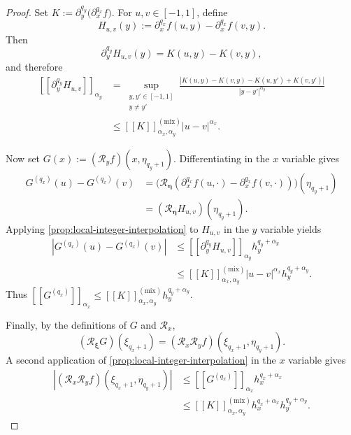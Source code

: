 \documentclass[11pt]{article}
\theoremstyle{definition}
\theoremstyle{remark}
\newcommand{\abs}[1]{\left\lvert #1\right\rvert}
\newcommand{\seminorm}[1]{\left[\!\left[ #1\right]\!\right]}
\begin{document}
\begin{proof}
Set $K:=  \partial_y^{q_y}\bigl(\partial_x^{q_x}f\bigr)$.
For $u,v\in[-1,1]$, define
\[
    H_{u,v}(y)
    :=
    \partial_x^{q_x}f(u,y)
    -
    \partial_x^{q_x}f(v,y).
\]
Then
\[
    \partial_y^{q_y}H_{u,v}(y)
    =
    K(u,y)-K(v,y),
\]
and therefore
\begin{align*}
    \seminorm{\partial_y^{q_y}H_{u,v}}_{\alpha_y}
    &=
    \sup_{\substack{y,y'\in[-1,1]\\y\ne y'}}
    \frac{
      \abs{
        K(u,y)-K(v,y)-K(u,y')+K(v,y')
      }
    }{
      \abs{y-y'}^{\alpha_y}
    }\\
    &\le
    \seminorm{K}_{\alpha_x,\alpha_y}^{(\mathrm{mix})}
    \abs{u-v}^{\alpha_x}.
\end{align*}

Now set
$G(x):=(\mathcal R_yf)(x,\eta_{q_y+1})$.
Differentiating in the $x$ variable
gives
\begin{align*}
    G^{(q_x)}(u)-G^{(q_x)}(v)
    &=
    \bigl(
      \mathcal R_{\boldsymbol\eta}
      (
        \partial_x^{q_x}f(u,\cdot)
        -
        \partial_x^{q_x}f(v,\cdot)
      )
    \bigr)(\eta_{q_y+1})\\
    &=
    (\mathcal R_{\boldsymbol\eta}H_{u,v})(\eta_{q_y+1}).
\end{align*}
Applying \cref{prop:local-integer-interpolation} to $H_{u,v}$ in the
$y$ variable yields
\begin{align*}
    \abs{
      G^{(q_x)}(u)-G^{(q_x)}(v)
    }
    &\le
    \seminorm{\partial_y^{q_y}H_{u,v}}_{\alpha_y}
    h_y^{q_y+\alpha_y}\\
    &\le
    \seminorm{K}_{\alpha_x,\alpha_y}^{(\mathrm{mix})}
    \abs{u-v}^{\alpha_x}h_y^{q_y+\alpha_y}.
\end{align*}
Thus
$
    \seminorm{G^{(q_x)}}_{\alpha_x}
    \le
    \seminorm{K}_{\alpha_x,\alpha_y}^{(\mathrm{mix})}
    h_y^{q_y+\alpha_y}
$.

Finally, by the definitions of $G$ and $\mathcal R_x$,
\[
    (\mathcal R_{\boldsymbol\xi}G)(\xi_{q_x+1})
    =
    (\mathcal R_x\mathcal R_yf)
    (\xi_{q_x+1},\eta_{q_y+1}).
\]
A second application of
\cref{prop:local-integer-interpolation} in the $x$ variable gives
\begin{align*}
    \abs{
      (\mathcal R_x\mathcal R_yf)
      (\xi_{q_x+1},\eta_{q_y+1})
    }
    &\le
    \seminorm{G^{(q_x)}}_{\alpha_x}
    h_x^{q_x+\alpha_x}\\
    &\le
    \seminorm{K}_{\alpha_x,\alpha_y}^{(\mathrm{mix})}
    h_x^{q_x+\alpha_x}h_y^{q_y+\alpha_y}.
\end{align*}
\end{proof}
\end{document}
